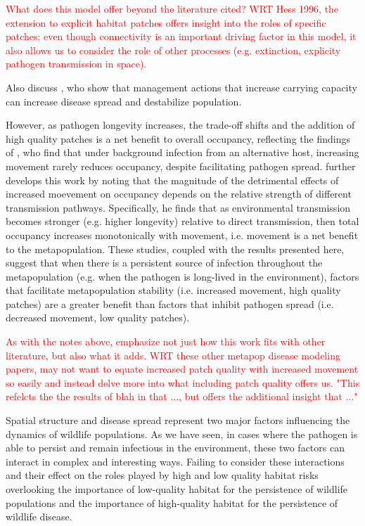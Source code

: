 \documentclass{svjour3}
\begin{document}
\textcolor{red}{What does this model offer beyond the literature cited?  WRT Hess 1996, the extension to explicit habitat patches offers insight into the roles of specific patches; even though connectivity is an important driving factor in this model, it also allows us to consider the role of other processes (e.g. extinction, explicity pathogen transmission in space).}

Also discuss \cite{Sharp2011}, who show that management actions that increase carrying capacity can increase disease spread and destabilize population.

However, as pathogen longevity increases, the trade-off shifts and the addition of high quality patches is a net benefit to overall occupancy, reflecting the findings of \cite{Gog2002}, who find that under background infection from an alternative host, increasing movement rarely reduces occupancy, despite facilitating pathogen spread.  \cite{Park2012} further develops this work by noting that the magnitude of the detrimental effects of increased moevement on occupancy depends on the relative strength of different transmission pathways.  Specifically, he finds that as environmental transmission becomes stronger (e.g. higher longevity) relative to direct transmission, then total occupancy increases monotonically with movement, i.e. movement is a net benefit to the metapopulation.  These studies, coupled with the results presented here, suggest that when there is a persistent source of infection throughout the metapopulation (e.g. when the pathogen is long-lived in the environment), factors that facilitate metapopulation stability (i.e. increased movement, high quality patches) are a greater benefit than factors that inhibit pathogen spread (i.e. decreased movement, low quality patches). 

\textcolor{red}{As with the notes above, emphasize not just how this work fits with other literature, but also what it adds.  WRT these other metapop disease modeling papers, may not want to equate increased patch quality with increased movement so easily and instead delve more into what including patch quality offers us.  "This refelcts the the results of blah in that ..., but offers the additional insight that ..."}

Spatial structure and disease spread represent two major factors influencing the dynamics of wildlife populations.  As we have seen, in cases where the pathogen is able to persist and remain infectious in the environment, these two factors can interact in complex and interesting ways.  Failing to consider these interactions and their effect on the roles played by high and low quality habitat risks overlooking the importance of low-quality habitat for the persistence of wildlife populations and the importance of high-quality habitat for the persistence of wildlife disease.
\end{document}
